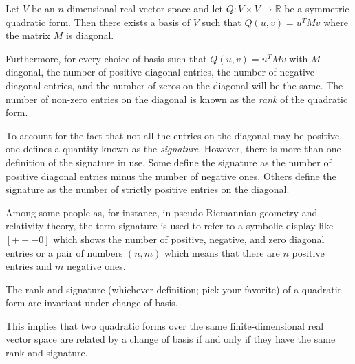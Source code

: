 \documentclass[12pt]{article}
\begin{document}
Let $V$ be an $n$-dimensional real vector space and let $Q \colon V \times V \to \mathbb{R}$ be a symmetric quadratic form.  Then there exists a basis of $V$ such that $Q(u,v) = u^T M v$ where the matrix $M$ is diagonal.

Furthermore, for every choice of basis such that $Q(u,v) = u^T M v$ with $M$ diagonal, the number of positive diagonal entries, the number of negative diagonal entries, and the number of zeros on the diagonal will be the same.  The number of non-zero entries on the diagonal is known as the \emph{rank} of the quadratic form.  

To account for the fact that not all the entries on the diagonal may be positive, one defines a quantity known as the \emph{signature}.  However, there is more than one definition of the signature in use.  Some define the signature as the number of positive diagonal entries minus the number of negative ones. Others define the signature as
the number of strictly positive entries on the diagonal. 

Among some people as, for instance, in pseudo-Riemannian geometry and relativity theory, the term signature is used to refer to a symbolic display like $[++-0]$ which shows the number of positive, negative, and zero diagonal entries or a pair of numbers $(n,m)$ which means that there are $n$ positive entries and $m$ negative ones.

The rank and signature (whichever definition; pick your favorite) of a quadratic form are invariant under change of basis.

This implies that two quadratic forms over the same finite-dimensional real vector space are related by a change of basis if and only if they have the same rank and signature.
\end{document}
